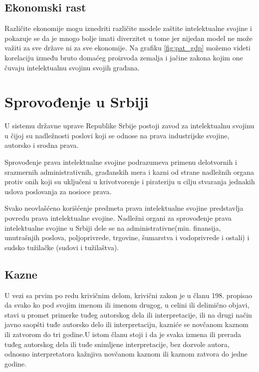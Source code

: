 \documentclass[a4paper]{article}
\begin{document}
\subsection{Ekonomski rast}
\label{subsec:ekon}

Različite ekonomije mogu iznedriti različite modele zaštite intelektualne
svojine i pokazuje se da je mnogo bolje imati diverzitet u tome jer nijedan
model ne može važiti za sve države ni za sve ekonomije. Na grafiku \ref{fig:pat_gdp} možemo videti korelaciju između bruto domaćeg proizvoda zemalja i jačine zakona kojim one čuvaju intelektualnu svojinu svojih građana.

\FloatBarrier
\section{Sprovođenje u Srbiji}

U sistemu državne uprave Republike Srbije postoji zavod za intelektualnu svojinu u čijoj su nadležnosti poslovi koji se odnose na prava industrijske svojine, autorsko i srodna prava.

Sprovođenje prava intelektualne svojine podrazumeva primenu delotvornih i srazmernih administrativnih, građanskih mera i kazni od strane nadležnih organa protiv onih koji su uključeni u krivotvorenje i pirateriju u cilju stvaranja jednakih uslova poslovanja za nosioce prava.

Svako neovlašćeno korišćenje predmeta prava intelektualne svojine predstavlja povredu prava intelektualne svojine. Nadležni organi za sprovođenje prava intelektualne svojine u Srbiji dele se na administrativne(min. finansija, unutrašnjih poslova, poljoprivrede, trgovine, šumarstva i vodoprivrede i ostali) i sudsko tužilačke (sudovi i tužilaštva).

\subsection{Kazne}

U vezi sa prvim po redu krivičnim delom, krivični zakon je u članu 198. propisao da svako ko pod svojim imenom ili imenom drugog, u celini ili delimično objavi, stavi u promet primerke tuđeg autorskog dela ili interpretacije, ili na drugi način javno saopšti tuđe autorsko delo ili interpretaciju, kazniće se novčanom kaznom ili zatvorom do tri godine.U istom članu stoji i da je svaka izmena ili prerada tuđeg autorskog dela ili tuđe snimljene interpretacije, bez dozvole autora, odnosno interpretatora kažnjiva novčanom kaznom ili kaznom zatvora do jedne godine. 
\end{document}
